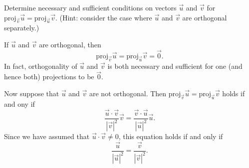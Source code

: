 \documentclass[noauthor,handout]{ximera}
\begin{document}
\begin{problem}
Determine necessary and sufficient conditions on vectors $\vec{u}$ and $\vec{v}$ for $\mathrm{proj}_\vec{v} \vec{u} = \mathrm{proj}_\vec{u} \vec{v}$. (Hint: consider the case where $\vec{u}$ and $\vec{v}$ are orthogonal separately.)

\begin{freeResponse}
If $\vec{u}$ and $\vec{v}$ are orthogonal, then
$$
\mathrm{proj}_\vec{v} \vec{u} = \mathrm{proj}_\vec{u} \vec{v} = \vec{0}.
$$
In fact, orthogonality of $\vec{u}$ and $\vec{v}$ is both necessary and sufficient for one (and hence both) projections to be $\vec{0}$. 

Now suppose that $\vec{u}$ and $\vec{v}$ are not orthogonal. Then $\mathrm{proj}_\vec{v} \vec{u} = \mathrm{proj}_\vec{u} \vec{v}$ holds if and ony if 
$$
\frac{\vec{u} \cdot \vec{v}}{\left|\vec{v}\right|^2} \vec{v} = \frac{\vec{v} \cdot \vec{u}}{\left|\vec{u}\right|^2} \vec{u}.
$$
Since we have assumed that $\vec{u} \cdot \vec{v} \neq 0$, this equation holds if and only if
$$
\frac{\vec{u}}{\left|\vec{u}\right|^2} = \frac{\vec{v}}{\left|\vec{v}\right|^2}.
$$
\end{freeResponse}
\end{problem}
\end{document}
